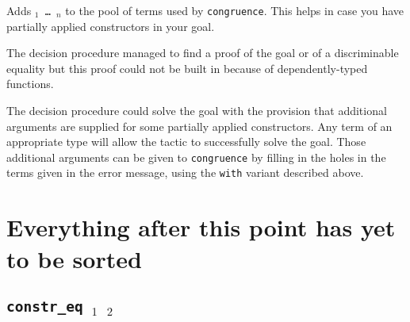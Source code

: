 \begin{coq_example*}
\begin{Variants}
  Adds {\tt \term$_1$ \dots\ \term$_n$} to the pool of terms used by
  {\tt congruence}. This helps in case you have partially applied
  constructors in your goal.
\end{Variants}

\begin{ErrMsgs}
  \item {}

    The decision procedure managed to find a proof of the goal or of
    a discriminable equality but this proof could not be built in {\Coq}
    because of dependently-typed functions.

  \item {}

    The decision procedure could solve the goal with the provision
    that additional arguments are supplied for some partially applied
    constructors. Any term of an appropriate type will allow the
    tactic to successfully solve the goal. Those additional arguments
    can be given to {\tt congruence} by filling in the holes in the
    terms given in the error message, using the {\tt with} variant
    described above.
\end{ErrMsgs}





































\section{Everything after this point has yet to be sorted}


\subsection{\tt constr\_eq \term$_1$ \term$_2$}
\label{constreq}


\end{coq_example*}
